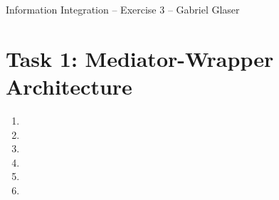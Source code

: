 \documentclass{scrartcl}
\begin{document}
	\begin{center}
		\LARGE
		Information Integration -- Exercise 3 -- Gabriel Glaser
	\end{center}
	
	\section*{Task 1: Mediator-Wrapper Architecture}
	\begin{enumerate}
		\item
		
		\item
		
		\item
		
		\item
		
		\item
		
		\item
		
	\end{enumerate}
	
\end{document}
